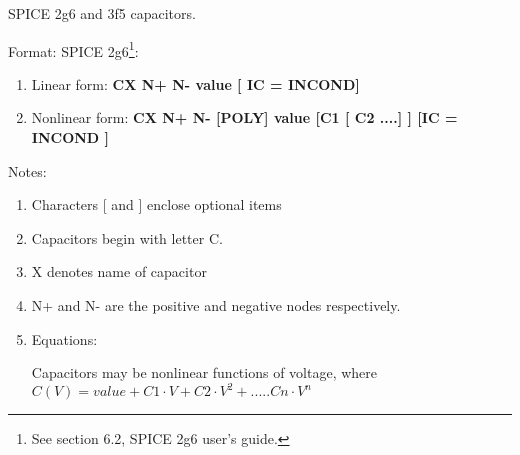 %
%
%
%

\renewcommand{\thesubfigure}{\thefigure(\alph{subfigure})}
\makeatletter
  \renewcommand{\@thesubfigure}{\thesubfigure:\space}
  \renewcommand{\p@subfigure}{}
\makeatother

\renewcommand{\thesubtable}{\thetable(\alph{subtable})}
\makeatletter
  \renewcommand{\@thesubtable}{\thesubtable:\space}
  \renewcommand{\p@subtable}{}
\makeatother

SPICE 2g6 and 3f5 capacitors.


\begin{flushleft}
Format: SPICE 2g6\footnote{See section 6.2, SPICE 2g6 user's guide.}: \hspace*{5mm}

\begin{enumerate}
 \item Linear form: \textbf{CX N+ N- value [ IC = INCOND]}
 \item Nonlinear form:  \textbf{CX N+ N- [POLY] value [C1 [ C2 ....] ] [IC = INCOND ]   }
\end{enumerate}

 \end{flushleft}

Notes: 
\begin{enumerate}
 \item Characters [ and ] enclose optional items 
 \item Capacitors begin with letter C.
 \item X denotes name of capacitor
 \item N+ and N- are the positive and negative nodes respectively.
 \item Equations:
\begin{flushleft}

Capacitors may be nonlinear functions of voltage, where                                                                                     
\linebreak
$C(V)=value + C1 \cdot V + C2 \cdot V^{2}+ ..... Cn \cdot V^{n}$                                                                            
\linebreak 
\end{flushleft}
\end{enumerate}

